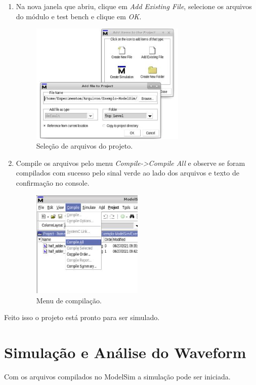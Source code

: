 \documentclass[12pt]{article}
\begin{document}
\begin{enumerate}[font=\bfseries]
    \item Na nova janela que abriu, clique em \textit{Add Existing File}, selecione os arquivos do módulo e test bench e clique em \textit{OK.}
    \begin{figure}[H]
    \centering
    \includegraphics[width=0.7\textwidth]{img/modelsim-add-files.jpg}
    \caption{\label{ref:modelsim-add-files}Seleção de arquivos do projeto.}
    \end{figure}

    \pagebreak

    \item Compile os arquivos pelo menu \textit{Compile->Compile All} e observe se foram compilados com sucesso pelo sinal verde ao lado dos arquivos e texto de confirmação no console.
    \begin{figure}[H]
    \centering
    \includegraphics[width=0.5\textwidth]{img/modelsim-compile.jpg}
    \caption{\label{ref:modelsim-compile}Menu de compilação.}
    \end{figure}
    
\end{enumerate}
Feito isso o projeto está pronto para ser simulado.

\section{Simulação e Análise do Waveform}
Com os arquivos compilados no ModelSim a simulação pode ser iniciada.
\end{document}
